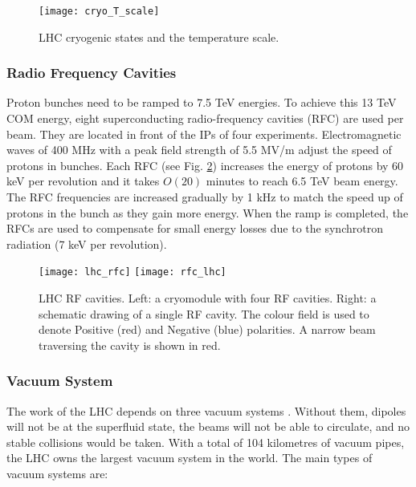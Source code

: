 \begin{normalsize}
\begin{figure}[H]
  \centering
  \texttt{[image: cryo\_T\_scale]}
  \caption{LHC cryogenic states and the temperature scale.}\label{cryo_T_scale}
  \label{cryo_T_scale}
\end{figure}




\subsubsection{Radio Frequency Cavities}\label{sec:rf}


Proton bunches need to be ramped to 7.5 TeV energies. To achieve this 13 TeV COM energy, eight superconducting radio-frequency cavities (RFC) are used per beam. They are located in front of the IPs of four experiments. Electromagnetic waves of 400 MHz with a peak field strength of 5.5 MV/m adjust the speed of protons in bunches. Each RFC (see Fig. \ref{lhc_rfc}) increases the energy of protons by 60 keV per revolution and it takes $O(20)$ minutes to reach 6.5 TeV beam energy. The RFC frequencies are increased gradually by 1 kHz to match the speed up of protons in the bunch as they gain more energy. When the ramp is completed, the RFCs are used to compensate for small energy losses due to the synchrotron radiation (7 keV per revolution). 




\begin{figure}[H]
\centering
\texttt{[image: lhc\_rfc]}
\texttt{[image: rfc\_lhc]}
\caption[RF cavities module.]{LHC RF cavities. Left: a cryomodule with four RF cavities. Right: a schematic drawing of a single RF cavity. The colour field is used to denote Positive (red) and Negative (blue) polarities. A narrow beam traversing the cavity is shown in red. }
\label{lhc_rfc}
\end{figure}




\subsubsection{Vacuum System}\label{sec:vacuum}



The work of the LHC depends on three vacuum systems \cite{LHC_vacuum}. Without them, dipoles will not be at the superfluid state, the beams will not be able to circulate, and no stable collisions would be taken. With a total of 104 kilometres of vacuum pipes, the LHC owns the largest vacuum system in the world. The main types of vacuum systems are:


\end{normalsize}
